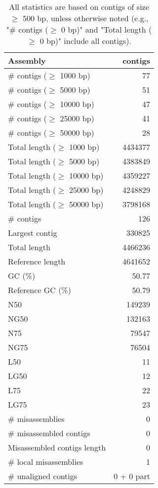 \documentclass[12pt,a4paper]{article}
\begin{document}
\begin{table}[ht]
\begin{center}
\caption{All statistics are based on contigs of size $\geq$ 500 bp, unless otherwise noted (e.g., "\# contigs ($\geq$ 0 bp)" and "Total length ($\geq$ 0 bp)" include all contigs).}
\begin{tabular}{|l*{1}{|r}|}
\hline
Assembly & contigs \\ \hline
\# contigs ($\geq$ 1000 bp) & 77 \\ \hline
\# contigs ($\geq$ 5000 bp) & 51 \\ \hline
\# contigs ($\geq$ 10000 bp) & 47 \\ \hline
\# contigs ($\geq$ 25000 bp) & 41 \\ \hline
\# contigs ($\geq$ 50000 bp) & 28 \\ \hline
Total length ($\geq$ 1000 bp) & 4434377 \\ \hline
Total length ($\geq$ 5000 bp) & 4383849 \\ \hline
Total length ($\geq$ 10000 bp) & 4359227 \\ \hline
Total length ($\geq$ 25000 bp) & 4248829 \\ \hline
Total length ($\geq$ 50000 bp) & 3798168 \\ \hline
\# contigs & 126 \\ \hline
Largest contig & 330825 \\ \hline
Total length & 4466236 \\ \hline
Reference length & 4641652 \\ \hline
GC (\%) & 50.77 \\ \hline
Reference GC (\%) & 50.79 \\ \hline
N50 & 149239 \\ \hline
NG50 & 132163 \\ \hline
N75 & 79547 \\ \hline
NG75 & 76504 \\ \hline
L50 & 11 \\ \hline
LG50 & 12 \\ \hline
L75 & 22 \\ \hline
LG75 & 23 \\ \hline
\# misassemblies & 0 \\ \hline
\# misassembled contigs & 0 \\ \hline
Misassembled contigs length & 0 \\ \hline
\# local misassemblies & 1 \\ \hline
\# unaligned contigs & 0 + 0 part \\ \hline

\end{tabular}
\end{center}
\end{table}
\end{document}
